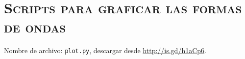 \chapter{\textsc{Scripts para graficar las formas de ondas}}\label{chap:matplotlib}
\noindent Nombre de archivo: \verb_plot.py_, descargar desde \url{http://is.gd/h1aCp6}.

